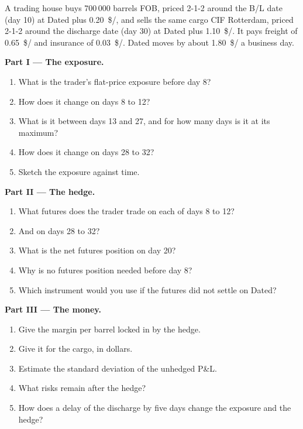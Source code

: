 \begin{problem}\label{pb:m3:physical-commodity-markets:1}
A trading house buys 700\,000 barrels FOB, priced 2-1-2 around the B/L date (day
10) at Dated plus \qty{0.20}{\$/\barrel}, and sells the same cargo CIF Rotterdam,
priced 2-1-2 around the discharge date (day 30) at Dated plus
\qty{1.10}{\$/\barrel}. It pays freight of \qty{0.65}{\$/\barrel} and insurance of
\qty{0.03}{\$/\barrel}. Dated moves by about \qty{1.80}{\$/\barrel} a business day.

\medskip\noindent\textbf{Part I --- The exposure.}
\begin{enumerate}
\item What is the trader's flat-price exposure before day 8?
\item How does it change on days 8 to 12?
\item What is it between days 13 and 27, and for how many days is it at its maximum?
\item How does it change on days 28 to 32?
\item Sketch the exposure against time.
\end{enumerate}

\medskip\noindent\textbf{Part II --- The hedge.}
\begin{enumerate}[resume]
\item What futures does the trader trade on each of days 8 to 12?
\item And on days 28 to 32?
\item What is the net futures position on day 20?
\item Why is no futures position needed before day 8?
\item Which instrument would you use if the futures did not settle on Dated?
\end{enumerate}

\medskip\noindent\textbf{Part III --- The money.}
\begin{enumerate}[resume]
\item Give the margin per barrel locked in by the hedge.
\item Give it for the cargo, in dollars.
\item Estimate the standard deviation of the unhedged P\&L.
\item What risks remain after the hedge?
\item How does a delay of the discharge by five days change the exposure and the hedge?
\end{enumerate}


\end{problem}
